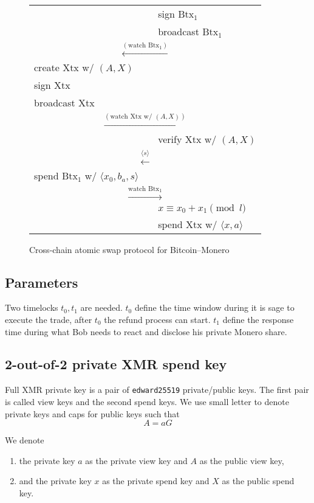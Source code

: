 \documentclass{llncs}
\begin{document}
\begin{figure}[H]
\begin{table}[H]
{\begin{tabular}{ | l l l | }
          & & sign $\text{Btx}_1$ \\
          & & broadcast $\text{Btx}_1$ \\
          \multicolumn{3}{|c|}{$\xleftarrow{(\text{watch Btx}_1)}$} \\
          create Xtx w/ $(A, X)$ & & \\
          sign Xtx & & \\
          broadcast Xtx & & \\
          \multicolumn{3}{|c|}{$\xrightarrow{(\text{watch Xtx w/ } (A, X))}$} \\
          & & verify Xtx w/ $(A, X)$ \\
          \multicolumn{3}{|c|}{$\xleftarrow{\langle s \rangle}$} \\
          spend $\text{Btx}_1$ w/ $\langle x_0, b_a, s \rangle$ & & \\
          \multicolumn{3}{|c|}{$\xrightarrow{\text{watch Btx}_1}$} \\
          & & $x \equiv x_0 + x_1 \pmod l$ \\
          & & spend Xtx w/ $\langle x, a \rangle$ \\
        \hline
      \end{tabular}}
    \end{table}
  \caption{Cross-chain atomic swap protocol for Bitcoin--Monero}
  \label{fig:protocol}
\end{figure}

\subsection{Parameters}
Two timelocks $t_0, t_1$ are needed. $t_0$ define the time window during it is sage to execute the trade, after $t_0$ the refund process can start. $t_1$ define the response time during what Bob needs to react and disclose his private Monero share.

\subsection{2-out-of-2 private XMR spend key}
Full XMR private key is a pair of \texttt{edward25519} private/public keys. The first pair is called view keys and the second spend keys. We use small letter to denote private keys and caps for public keys such that
$$A = aG$$

We denote
\begin{enumerate}[label=(\roman*)]
\item the private key $a$ as the private view key and $A$ as the public view key,
\item and the private key $x$ as the private spend key and $X$ as the public spend key.
\end{enumerate}
\end{document}
